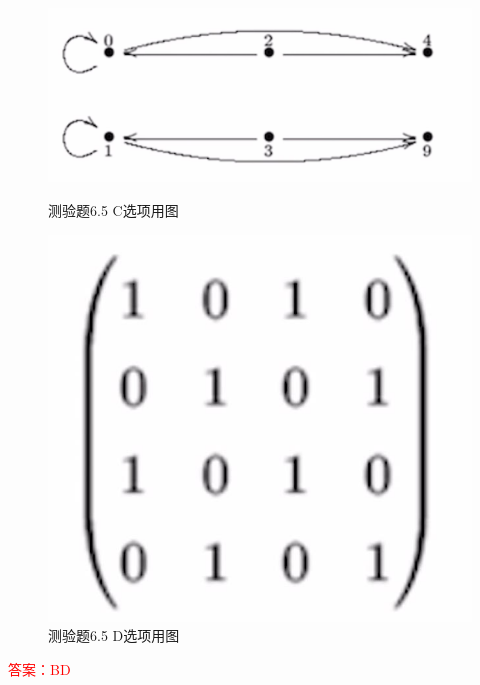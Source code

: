 \documentclass[UTF8, heading=true]{ctexart}
\begin{document}
\begin{figure}[H]
    \centering
    \begin{minipage}[t]{0.45\textwidth}
        \centering
        \includegraphics[width=1\textwidth]{6.5_1.jpg} %
	      \vspace{-0.3cm}
        \caption{测验题6.5 C选项用图}
    \end{minipage}
	  \hspace{0.1\textwidth} %
    \begin{minipage}[t]{0.23\textwidth}
        \centering
        \includegraphics[width=1\textwidth]{6.5_2.jpg} %
	      \vspace{-0.3cm}
        \caption{测验题6.5 D选项用图}
\end{minipage}
\end{figure}

\textcolor{red}{答案：BD}
\end{document}
